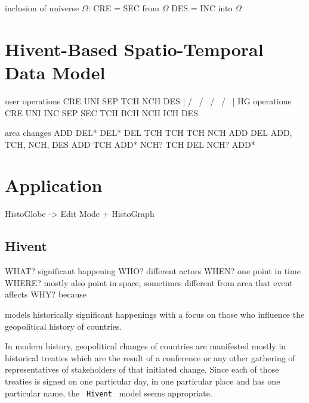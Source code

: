 inclusion of universe $\Omega$:
CRE = SEC from $\Omega$
DES = INC into $\Omega$



\section{Hivent-Based Spatio-Temporal Data Model} %
\label{sec:hivent_based_spatio_temporal_data_model}

user operations     CRE     UNI          SEP         TCH         NCH      DES
                     |      / \         /   \        /  \       /   \      |
HG operations       CRE   UNI   INC   SEP   SEC   TCH   BCH   NCH   ICH   DES

area changes        ADD   DEL*  DEL*  DEL   TCH   TCH   TCH   NCH   ADD   DEL
ADD, TCH, NCH, DES        ADD   TCH   ADD*  NCH?        TCH         DEL
                                NCH?        ADD*







\section{Application} %
\label{sec:application}


HistoGlobe -> Edit Mode + HistoGraph



\subsection{Hivent} %
\label{sub:hivent}

  WHAT? significant happening
  WHO? different actors
  WHEN? one point in time
  WHERE? mostly also point in space, sometimes different from area that event affects
  WHY? because

models historically significant happenings with a focus on those who influence the geopolitical history of countries.

In modern history, geopolitical changes of countries are manifested mostly in historical treaties which are the result of a conference or any other gathering of representatives of stakeholders of that initiated change. Since each of those treaties is signed on one particular day, in one particular place and has one particular name, the ~\texttt{Hivent}~ model seems appropriate.

